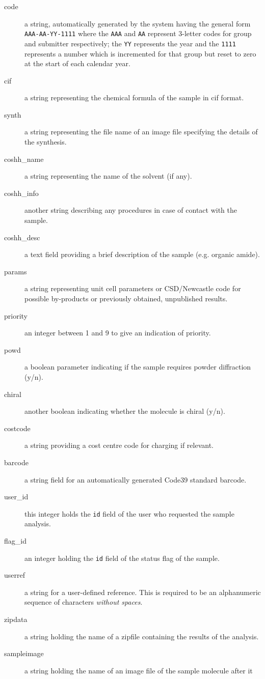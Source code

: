 \documentclass[12pt]{article}
\begin{document}
\begin{description}
\item[code]
a string, automatically generated by the system having the
general form \verb=AAA-AA-YY-1111= where the \verb=AAA= and \verb=AA= 
represent 3-letter codes for group and submitter respectively; 
the \verb=YY= represents the year and the \verb=1111= represents a number 
which is incremented for that group but reset to zero at the start of each 
calendar year.
\item[cif]
a string representing the chemical formula of the sample in cif format.
\item[synth]
a string representing the file name of an image file specifying the details
of the synthesis.
\item[coshh\_name]
a string representing the name of the solvent (if any).
\item[coshh\_info]
another string describing any procedures in case of contact with the sample.
\item[coshh\_desc]
a text field providing a brief description of the sample (e.g. organic amide).
\item[params]
a string representing unit cell parameters
or CSD/Newcastle code for possible by-products or previously obtained, 
unpublished results.
\item[priority]
an integer between 1 and 9 to give an indication of priority.
\item[powd]
a boolean parameter indicating if the sample requires powder diffraction (y/n).
\item[chiral]
another boolean indicating whether the molecule is chiral (y/n).
\item[costcode]
a string providing a cost centre code for charging if relevant.
\item[barcode]
a string field for an automatically generated Code39 standard barcode.
\item[user\_id]
this integer holds the \verb=id= field of the user who requested the
sample analysis.
\item[flag\_id]
an integer holding the \verb=id= field of the status flag of the sample.
\item[userref]
a string for a user-defined reference. This is required to be an
alphanumeric sequence of characters \emph{without spaces}.
\item[zipdata]
a string holding the name of a zipfile containing the results of the analysis.
\item[sampleimage]
a string holding the name of an image file of the sample molecule after it

\end{description}
\end{document}

